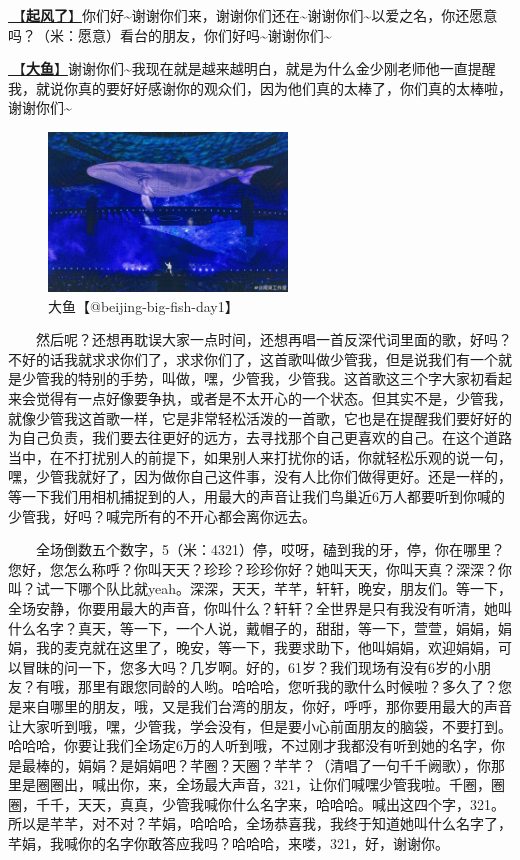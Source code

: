 \documentclass[]{ctexbook}
\begin{document}
\hyperref[the-wind-rises]{🎵【\textbf{起风了}】}你们好\textasciitilde 谢谢你们来，谢谢你们还在\textasciitilde 谢谢你们\textasciitilde 以爱之名，你还愿意吗？（米：愿意）看台的朋友，你们好吗\textasciitilde 谢谢你们\textasciitilde{}

\hyperref[big-fish]{🎵【\textbf{大鱼}】}谢谢你们\textasciitilde 我现在就是越来越明白，就是为什么金少刚老师他一直提醒我，就说你真的要好好感谢你的观众们，因为他们真的太棒了，你们真的太棒啦，谢谢你们\textasciitilde{}

\begin{figure}

{\centering \includegraphics[width=180pt]{img/beijing20240921/big-fish} 

}

\caption{大鱼【@beijing-big-fish-day1】}\label{fig:unnamed-chunk-86}
\end{figure}

  然后呢？还想再耽误大家一点时间，还想再唱一首反深代词里面的歌，好吗？不好的话我就求求你们了，求求你们了，这首歌叫做少管我，但是说我们有一个就是少管我的特别的手势，叫做，嘿，少管我，少管我。这首歌这三个字大家初看起来会觉得有一点好像要争执，或者是不太开心的一个状态。但其实不是，少管我，就像少管我这首歌一样，它是非常轻松活泼的一首歌，它也是在提醒我们要好好的为自己负责，我们要去往更好的远方，去寻找那个自己更喜欢的自己。在这个道路当中，在不打扰别人的前提下，如果别人来打扰你的话，你就轻松乐观的说一句，嘿，少管我就好了，因为做你自己这件事，没有人比你们做得更好。还是一样的，等一下我们用相机捕捉到的人，用最大的声音让我们鸟巢近6万人都要听到你喊的少管我，好吗？喊完所有的不开心都会离你远去。

  全场倒数五个数字，5（米：4321）停，哎呀，磕到我的牙，停，你在哪里？您好，您怎么称呼？你叫天天？珍珍？珍珍你好？她叫天天，你叫天真？深深？你叫？试一下哪个队比就yeah。深深，天天，芊芊，轩轩，晚安，朋友们。等一下，全场安静，你要用最大的声音，你叫什么？轩轩？全世界是只有我没有听清，她叫什么名字？真天，等一下，一个人说，戴帽子的，甜甜，等一下，萱萱，娟娟，娟娟，我的麦克就在这里了，晚安，等一下，我要求助下，他叫娟娟，欢迎娟娟，可以冒昧的问一下，您多大吗？几岁啊。好的，61岁？我们现场有没有6岁的小朋友？有哦，那里有跟您同龄的人哟。哈哈哈，您听我的歌什么时候啦？多久了？您是来自哪里的朋友，哦，又是我们台湾的朋友，你好，呼呼，那你要用最大的声音让大家听到哦，嘿，少管我，学会没有，但是要小心前面朋友的脑袋，不要打到。哈哈哈，你要让我们全场定6万的人听到哦，不过刚才我都没有听到她的名字，你是最棒的，娟娟？是娟娟吧？芊圈？天圈？芊芊？（清唱了一句千千阙歌），你那里是圈圈出，喊出你，来，全场最大声音，321，让你们喊嘿少管我啦。千圈，圈圈，千千，天天，真真，少管我喊你什么名字来，哈哈哈。喊出这四个字，321。所以是芊芊，对不对？芊娟，哈哈哈，全场恭喜我，我终于知道她叫什么名字了，芊娟，我喊你的名字你敢答应我吗？哈哈哈，来喽，321，好，谢谢你。
\end{document}

